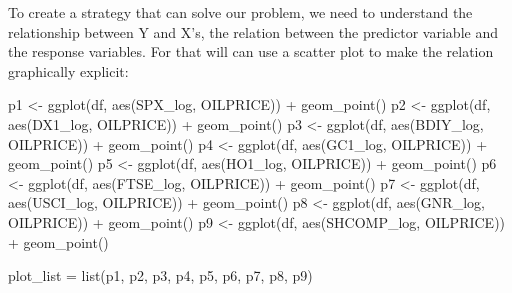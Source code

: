 \documentclass[
]{article}
\newenvironment{Shaded}{\begin{snugshade}}{\end{snugshade}}
\newcommand{\FunctionTok}[1]{\textcolor[rgb]{0.00,0.00,0.00}{#1}}
\newcommand{\NormalTok}[1]{#1}
\newcommand{\OtherTok}[1]{\textcolor[rgb]{0.56,0.35,0.01}{#1}}
\newcommand{\SpecialCharTok}[1]{\textcolor[rgb]{0.00,0.00,0.00}{#1}}
\begin{document}
To create a strategy that can solve our problem, we need to understand
the relationship between Y and X's, the relation between the predictor
variable and the response variables. For that will can use a scatter
plot to make the relation graphically explicit:

\begin{Shaded}
\begin{Highlighting}[]
\NormalTok{p1 }\OtherTok{\textless{}{-}} \FunctionTok{ggplot}\NormalTok{(df, }\FunctionTok{aes}\NormalTok{(SPX\_log, OILPRICE)) }\SpecialCharTok{+} \FunctionTok{geom\_point}\NormalTok{()}
\NormalTok{p2 }\OtherTok{\textless{}{-}} \FunctionTok{ggplot}\NormalTok{(df, }\FunctionTok{aes}\NormalTok{(DX1\_log, OILPRICE)) }\SpecialCharTok{+}  \FunctionTok{geom\_point}\NormalTok{()}
\NormalTok{p3 }\OtherTok{\textless{}{-}} \FunctionTok{ggplot}\NormalTok{(df, }\FunctionTok{aes}\NormalTok{(BDIY\_log, OILPRICE)) }\SpecialCharTok{+}  \FunctionTok{geom\_point}\NormalTok{()}
\NormalTok{p4 }\OtherTok{\textless{}{-}} \FunctionTok{ggplot}\NormalTok{(df, }\FunctionTok{aes}\NormalTok{(GC1\_log, OILPRICE)) }\SpecialCharTok{+}  \FunctionTok{geom\_point}\NormalTok{()}
\NormalTok{p5 }\OtherTok{\textless{}{-}} \FunctionTok{ggplot}\NormalTok{(df, }\FunctionTok{aes}\NormalTok{(HO1\_log, OILPRICE)) }\SpecialCharTok{+}  \FunctionTok{geom\_point}\NormalTok{()}
\NormalTok{p6 }\OtherTok{\textless{}{-}} \FunctionTok{ggplot}\NormalTok{(df, }\FunctionTok{aes}\NormalTok{(FTSE\_log, OILPRICE)) }\SpecialCharTok{+}  \FunctionTok{geom\_point}\NormalTok{()}
\NormalTok{p7 }\OtherTok{\textless{}{-}} \FunctionTok{ggplot}\NormalTok{(df, }\FunctionTok{aes}\NormalTok{(USCI\_log, OILPRICE)) }\SpecialCharTok{+}  \FunctionTok{geom\_point}\NormalTok{()}
\NormalTok{p8 }\OtherTok{\textless{}{-}} \FunctionTok{ggplot}\NormalTok{(df, }\FunctionTok{aes}\NormalTok{(GNR\_log, OILPRICE)) }\SpecialCharTok{+}  \FunctionTok{geom\_point}\NormalTok{()}
\NormalTok{p9 }\OtherTok{\textless{}{-}} \FunctionTok{ggplot}\NormalTok{(df, }\FunctionTok{aes}\NormalTok{(SHCOMP\_log, OILPRICE)) }\SpecialCharTok{+}  \FunctionTok{geom\_point}\NormalTok{()}

\NormalTok{plot\_list }\OtherTok{=} \FunctionTok{list}\NormalTok{(p1, p2, p3, p4, p5, p6, p7, p8, p9)}


\end{Highlighting}
\end{Shaded}
\end{document}
